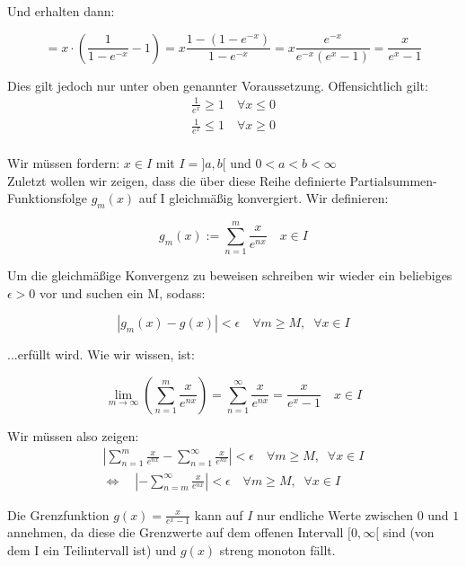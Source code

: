 \documentclass[a4paper,german,12pt,smallheadings]{scrartcl}
\begin{document}
Und erhalten dann:

\begin{equation*}
    = x \cdot \left( \frac{1}{1-e^{-x}} - 1 \right) = x \frac{1 - (1-e^{-x})}{1-e^{-x}} = x \frac{e^{-x}}{e^{-x} (e^x - 1)} = \frac{x}{e^x-1}
\end{equation*}

Dies gilt jedoch nur unter oben genannter Voraussetzung. Offensichtlich gilt:
\begin{align*}
\frac{1}{e^x}\geq 1 \quad \forall x\leq 0\\
\frac{1}{e^x}\le 1 \quad \forall x\ge 0\\
\end{align*}

Wir müssen fordern: $x\in I$ mit $I=]a,b[$ und $0<a<b<\infty$\\
Zuletzt wollen wir zeigen, dass die über diese Reihe definierte Partialsummen-Funktionsfolge $g_m(x)$ auf I gleichmäßig konvergiert. Wir definieren:

\begin{equation*}
g_m(x):=\sum_{n=1}^{m}\frac{x}{e^{nx}} \quad x\in I
\end{equation*}

Um die gleichmäßige Konvergenz zu beweisen schreiben wir wieder ein beliebiges $\epsilon>0$ vor und suchen ein M, sodass:

\begin{equation}
|g_m(x)-g(x)|<\epsilon \quad \forall m\geq M, \;\; \forall x\in I
\end{equation}

...erfüllt wird. Wie wir wissen, ist:

\begin{equation*}
\lim\limits_{m \to \infty}\left(\sum_{n=1}^{m}\frac{x}{e^{nx}}\right)=\sum_{n=1}^{\infty}\frac{x}{e^{nx}}=\frac{x}{e^x-1} \quad x\in I
\end{equation*}

Wir müssen also zeigen:
\begin{align*}
\left|\sum_{n=1}^{m}\frac{x}{e^{nx}}-\sum_{n=1}^{\infty}\frac{x}{e^{nx}}\right| < \epsilon \quad \forall m\geq M, \;\; \forall x \in I\\
\Leftrightarrow \quad \left|-\sum_{n=m}^{\infty}\frac{x}{e^{nx}}\right| < \epsilon \quad \forall m\geq M, \;\; \forall x \in I
\end{align*}

Die Grenzfunktion $g(x)=\frac{x}{e^x-1}$ kann auf $I$ nur endliche Werte zwischen $0$ und $1$ annehmen, da diese die Grenzwerte auf dem offenen Intervall $[0,\infty[$ sind (von dem I ein Teilintervall ist) und $g(x)$ streng monoton fällt.\\
\end{document}
